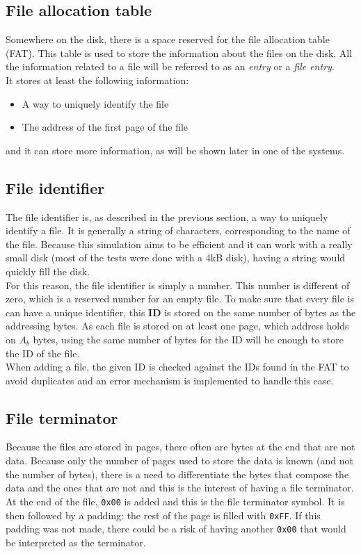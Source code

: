 \documentclass[10pt,a4paper]{ULBreport}
\begin{document}
\subsection{File allocation table}
Somewhere on the disk, there is a space reserved for the file allocation table (FAT). This table is used to store the information about the files on the disk. All the information related to a file will be referred to as an \textit{entry} or a \textit{file entry}.\\
It stores at least the following information:
\begin{itemize}
    \item A way to uniquely identify the file
    \item The address of the first page of the file
\end{itemize}
and it can store more information, as will be shown later in one of the systems.
\subsection{File identifier}
The file identifier is, as described in the previous section, a way to uniquely identify a file. It is generally a string of characters, corresponding to the name of the file. Because this simulation aims to be efficient and it can work with a really small disk (most of the tests were done with a 4kB disk), having a string would quickly fill the disk. \\
For this reason, the file identifier is simply a number. This number is different of zero, which is a reserved number for an empty file. To make sure that every file is can have a unique identifier, this \textbf{ID} is stored on the same number of bytes as the addressing bytes. As each file is stored on at least one page, which address holds on $A_b$ bytes, using the same number of bytes for the ID will be enough to store the ID of the file. \\
When adding a file, the given ID is checked against the IDs found in the FAT to avoid duplicates and an error mechanism is implemented to handle this case. 
\subsection{File terminator}
Because the files are stored in pages, there often are bytes at the end that are not data. Because only the number of pages used to store the data is known (and not the number of bytes), there is a need to differentiate the bytes that compose the data and the ones that are not and this is the interest of having a file terminator. \\
At the end of the file, \texttt{0x00} is added and this is the file terminator symbol. It is then followed by a padding: the rest of the page is filled with \texttt{0xFF}. If this padding was not made, there could be a risk of having another \texttt{0x00} that would be interpreted as the terminator.
\end{document}
